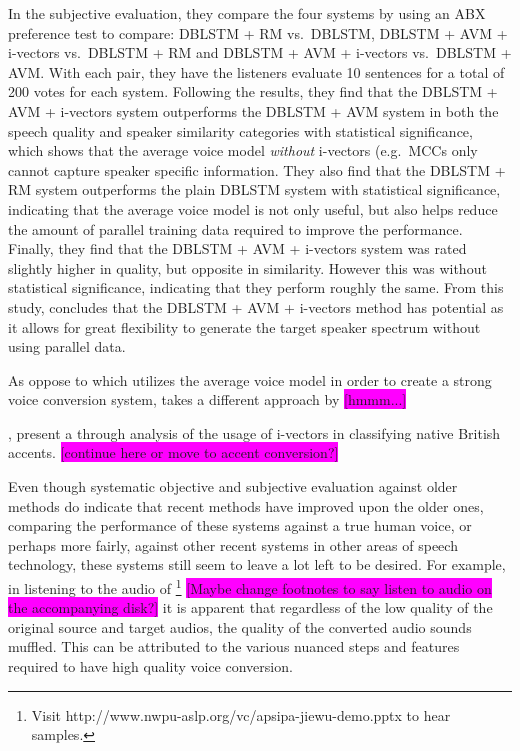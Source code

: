 \documentclass
[
    a4paper,
    twoside,
    12pt,
]
{report}
\begin{document}
In the subjective evaluation, they compare the four systems by using an
ABX preference test to compare: DBLSTM + RM vs.~DBLSTM, DBLSTM + AVM +
i-vectors vs.~DBLSTM + RM and DBLSTM + AVM + i-vectors vs.~DBLSTM + AVM.
With each pair, they have the listeners evaluate 10 sentences for a
total of 200 votes for each system. Following the results, they find
that the DBLSTM + AVM + i-vectors system outperforms the DBLSTM + AVM
system in both the speech quality and speaker similarity categories with
statistical significance, which shows that the average voice model
\emph{without} i-vectors (e.g.~MCCs only cannot capture speaker specific
information. They also find that the DBLSTM + RM system outperforms the
plain DBLSTM system with statistical significance, indicating that the
average voice model is not only useful, but also helps reduce the amount
of parallel training data required to improve the performance. Finally,
they find that the DBLSTM + AVM + i-vectors system was rated slightly
higher in quality, but opposite in similarity. However this was without
statistical significance, indicating that they perform roughly the same.
From this study, \textcite{wu2016} concludes that the DBLSTM + AVM +
i-vectors method has potential as it allows for great flexibility to
generate the target speaker spectrum without using parallel data.

As oppose to \textcite{wu2016} which utilizes the average voice model in
order to create a strong voice conversion system,
\textcite{kinnunen2017} takes a different approach by
\colorbox{magenta}{[hmmm...]}

\textcite{demarco2013}, present a through analysis of the usage of
i-vectors in classifying native British accents.
\colorbox{magenta}{[continue here or move to accent conversion?]}

Even though systematic objective and subjective evaluation against older
methods do indicate that recent methods have improved upon the older
ones, comparing the performance of these systems against a true human
voice, or perhaps more fairly, against other recent systems in other
areas of speech technology, these systems still seem to leave a lot left
to be desired. For example, in listening to the audio of
\textcite{wu2016}\footnote{Visit http://www.nwpu-aslp.org/vc/apsipa-jiewu-demo.pptx to hear samples.}
\colorbox{magenta}{[Maybe change footnotes to say listen to audio on the accompanying disk?]}
it is apparent that regardless of the low quality of the original source
and target audios, the quality of the converted audio sounds muffled.
This can be attributed to the various nuanced steps and features
required to have high quality voice conversion.
\end{document}
